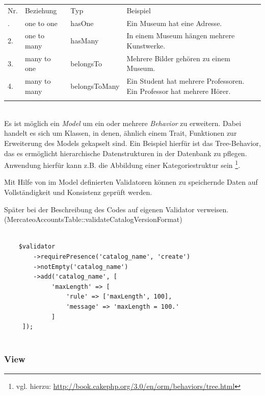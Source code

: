 	
		\begin{tabularx}{\textwidth}{p{1cm} X X p{8cm}}
		\cline{2-4}
		\rowcolor[HTML]{EFEFEF} 
		 Nr. & Beziehung & Typ & Beispiel \\ \cline{1-4} \addlinespace
		1. & one to one & hasOne & Ein Museum hat eine Adresse. \\
		2. & one to many & hasMany & In einem Museum hängen mehrere Kunstwerke. \\
		3. & many to one & belongsTo & Mehrere Bilder gehören zu einem Museum. \\  
		4. & many to many & belongsToMany & Ein Student hat mehrere Professoren. Ein Professor hat mehrere Hörer. \\ \addlinespace \cline{1-4}     
		\end{tabularx}
	\\
	
	
	Es ist möglich ein \textit{Model} um ein oder mehrere \textit{Behavior} zu erweitern. Dabei handelt es sich um Klassen, in denen, ähnlich einem Trait, Funktionen zur Erweiterung des Models gekapselt sind. Ein Beispiel hierfür ist das Tree-Behavior, das es ermöglicht hierarchische Datenstrukturen in der Datenbank zu pflegen. Anwendung hierfür kann z.B. die Abbildung einer Kategoriestruktur sein \footnote{vgl. hierzu: \url{http://book.cakephp.org/3.0/en/orm/behaviors/tree.html}}.
	
	Mit Hilfe von im Model definierten Validatoren können zu speichernde Daten auf Vollständigkeit und Konsistenz geprüft werden. 
	
	 Später bei der Beschreibung des Codes auf eigenen Validator verweisen. (MercateoAccountsTable::validateCatalogVersionFormat)
	\lstset{language=PHP}
	\begin{lstlisting}

	$validator
     	->requirePresence('catalog_name', 'create')
     	->notEmpty('catalog_name')
     	->add('catalog_name', [
	         'maxLength' => [
	             'rule' => ['maxLength', 100],
	             'message' => 'maxLength = 100.'
	         ]
     ]);
	
	\end{lstlisting}
	
	\subsubsection{View}
	
